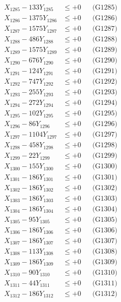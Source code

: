 \documentclass[a4paper,10pt]{article}
\begin{document}
{\begin{align}
X_{1285} - 133Y_{1285} &\leq +0 && \text{(G1285)} \\
X_{1286} - 1375Y_{1286} &\leq +0 && \text{(G1286)} \\
X_{1287} - 1575Y_{1287} &\leq +0 && \text{(G1287)} \\
X_{1288} - 486Y_{1288} &\leq +0 && \text{(G1288)} \\
X_{1289} - 1575Y_{1289} &\leq +0 && \text{(G1289)} \\
X_{1290} - 676Y_{1290} &\leq +0 && \text{(G1290)} \\
\allowbreak
X_{1291} - 124Y_{1291} &\leq +0 && \text{(G1291)} \\
X_{1292} - 747Y_{1292} &\leq +0 && \text{(G1292)} \\
X_{1293} - 255Y_{1293} &\leq +0 && \text{(G1293)} \\
X_{1294} - 272Y_{1294} &\leq +0 && \text{(G1294)} \\
X_{1295} - 102Y_{1295} &\leq +0 && \text{(G1295)} \\
X_{1296} - 86Y_{1296} &\leq +0 && \text{(G1296)} \\
X_{1297} - 1104Y_{1297} &\leq +0 && \text{(G1297)} \\
X_{1298} - 458Y_{1298} &\leq +0 && \text{(G1298)} \\
X_{1299} - 22Y_{1299} &\leq +0 && \text{(G1299)} \\
X_{1300} - 155Y_{1300} &\leq +0 && \text{(G1300)} \\
\allowbreak
X_{1301} - 186Y_{1301} &\leq +0 && \text{(G1301)} \\
X_{1302} - 186Y_{1302} &\leq +0 && \text{(G1302)} \\
X_{1303} - 186Y_{1303} &\leq +0 && \text{(G1303)} \\
X_{1304} - 186Y_{1304} &\leq +0 && \text{(G1304)} \\
X_{1305} - 95Y_{1305} &\leq +0 && \text{(G1305)} \\
X_{1306} - 186Y_{1306} &\leq +0 && \text{(G1306)} \\
X_{1307} - 186Y_{1307} &\leq +0 && \text{(G1307)} \\
X_{1308} - 113Y_{1308} &\leq +0 && \text{(G1308)} \\
X_{1309} - 186Y_{1309} &\leq +0 && \text{(G1309)} \\
X_{1310} - 90Y_{1310} &\leq +0 && \text{(G1310)} \\
\allowbreak
X_{1311} - 44Y_{1311} &\leq +0 && \text{(G1311)} \\
X_{1312} - 186Y_{1312} &\leq +0 && \text{(G1312)} \\

\end{align}}
\end{document}
